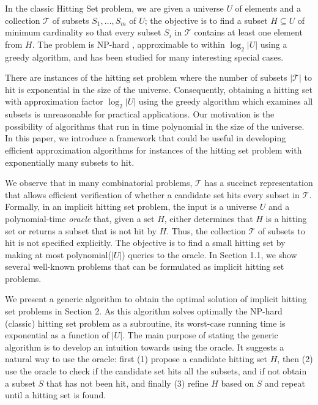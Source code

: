 \documentclass[11pt]{article}
\def\T{\mathcal{T}}
\begin{document}
In the classic Hitting Set problem, we are given a universe $U$ of elements and a collection $\T$ of subsets $S_1, \ldots, S_m$ of $U$; the objective is to find a subset $H\subseteq U$ of minimum cardinality so that every subset $S_i$ in $\T$ contains at least one element from $H$. The problem is NP-hard \cite{karp-np-complete}, approximable to within $\log_2 |U|$ using a greedy algorithm, and has been studied for many interesting special cases.

There are instances of the hitting set problem where the number of subsets $|\T|$ to hit is exponential in the size of the universe. Consequently, obtaining a hitting set with approximation factor $\log_2|U|$ using the greedy algorithm which examines all subsets is unreasonable for practical applications. Our motivation is the possibility of algorithms that run in time polynomial in the size of the universe. In this paper, we introduce a framework that could be useful in developing efficient approximation algorithms for instances of the hitting set problem with exponentially many subsets to hit.

We observe that in many combinatorial problems, $\T$ has a succinct
representation that allows efficient verification of whether a candidate set
hits every subset in $\T$. Formally, in an implicit hitting set problem, the
input is a universe $U$ and a polynomial-time {\it oracle} that, given a set
$H$, either determines that $H$ is a hitting set or returns a subset that is
not hit by $H$. Thus, the collection $\T$ of subsets to hit is not specified
explicitly. The objective is to find a small hitting set by making at most
polynomial($|U|$) queries to the oracle. In Section 1.1, we show several
well-known problems that can be formulated as implicit hitting set problems.



We present a generic algorithm to obtain the optimal solution of implicit hitting set problems in Section 2. As this algorithm solves optimally the NP-hard (classic) hitting set problem as a subroutine, its worst-case running time is exponential as a function of $|U|$. The main purpose of stating the generic algorithm is to develop an intuition towards using the oracle. It suggests a natural way to use the oracle: first (1) propose a candidate hitting set $H$, then (2) use the oracle to check if the candidate set hits all the subsets, and if not obtain a subset $S$ that has not been hit, and finally (3) refine $H$ based on $S$ and repeat until a hitting set is found. 
\end{document}
